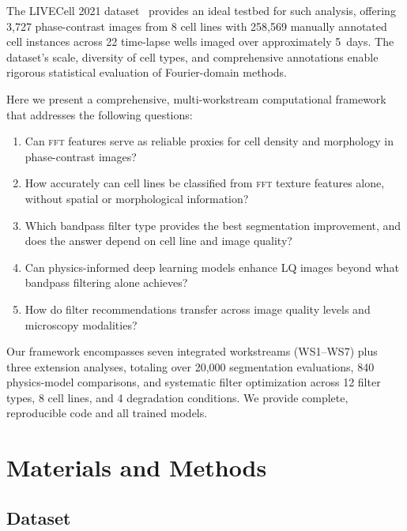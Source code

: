 \documentclass[11pt,a4paper]{article}
\newcommand{\fft}{\textsc{fft}\xspace}
\begin{document}
The LIVECell 2021 dataset~\cite{edlund2021livecell} provides an ideal
testbed for such analysis, offering 3,727 phase-contrast images from 8
cell lines with 258,569 manually annotated cell instances across 22
time-lapse wells imaged over approximately 5~days. The dataset's scale,
diversity of cell types, and comprehensive annotations enable rigorous
statistical evaluation of Fourier-domain methods.

Here we present a comprehensive, multi-workstream computational framework
that addresses the following questions:

\begin{enumerate}[label=\textbf{Q\arabic*:},leftmargin=3em]
    \item Can \fft features serve as reliable proxies for cell density
          and morphology in phase-contrast images?
    \item How accurately can cell lines be classified from \fft texture
          features alone, without spatial or morphological information?
    \item Which bandpass filter type provides the best segmentation
          improvement, and does the answer depend on cell line and image
          quality?
    \item Can physics-informed deep learning models enhance LQ images
          beyond what bandpass filtering alone achieves?
    \item How do filter recommendations transfer across image quality
          levels and microscopy modalities?
\end{enumerate}

Our framework encompasses seven integrated workstreams (WS1--WS7) plus
three extension analyses, totaling over 20,000 segmentation evaluations,
840 physics-model comparisons, and systematic filter optimization across
12 filter types, 8 cell lines, and 4 degradation conditions. We provide
complete, reproducible code and all trained models.

\section{Materials and Methods}
\label{sec:methods}

\subsection{Dataset}
\label{sec:dataset}
\end{document}

